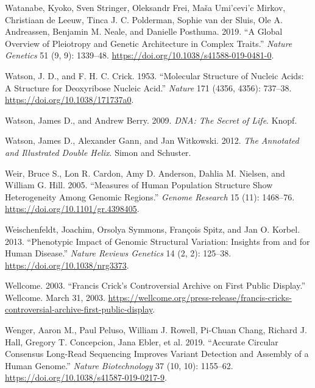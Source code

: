 \documentclass[
]{book}
\newlength{\cslhangindent}
\newlength{\cslentryspacingunit} %
\newenvironment{CSLReferences}[2] %
 {%
  \setlength{\parindent}{0pt}
  \ifodd #1
  \let\oldpar\par
  \def\par{\hangindent=\cslhangindent\oldpar}
  \fi
  \setlength{\parskip}{#2\cslentryspacingunit}
 }%
 {}
\begin{document}
\begin{CSLReferences}{1}{0}
\leavevmode{}%
Watanabe, Kyoko, Sven Stringer, Oleksandr Frei, Maša Umi'cevi'c Mirkov, Christiaan de Leeuw, Tinca J. C. Polderman, Sophie van der Sluis, Ole A. Andreassen, Benjamin M. Neale, and Danielle Posthuma. 2019. {``A Global Overview of Pleiotropy and Genetic Architecture in Complex Traits.''} \emph{Nature Genetics} 51 (9, 9): 1339--48. \url{https://doi.org/10.1038/s41588-019-0481-0}.

\leavevmode{}%
Watson, J. D., and F. H. C. Crick. 1953. {``Molecular {Structure} of {Nucleic Acids}: {A Structure} for {Deoxyribose Nucleic Acid}.''} \emph{Nature} 171 (4356, 4356): 737--38. \url{https://doi.org/10.1038/171737a0}.

\leavevmode{}%
Watson, James D., and Andrew Berry. 2009. \emph{{DNA}: {The} Secret of Life}. {Knopf}.

\leavevmode{}%
Watson, James D., Alexander Gann, and Jan Witkowski. 2012. \emph{The Annotated and Illustrated Double Helix}. {Simon and Schuster}.

\leavevmode{}%
Weir, Bruce S., Lon R. Cardon, Amy D. Anderson, Dahlia M. Nielsen, and William G. Hill. 2005. {``Measures of Human Population Structure Show Heterogeneity Among Genomic Regions.''} \emph{Genome Research} 15 (11): 1468--76. \url{https://doi.org/10.1101/gr.4398405}.

\leavevmode{}%
Weischenfeldt, Joachim, Orsolya Symmons, François Spitz, and Jan O. Korbel. 2013. {``Phenotypic Impact of Genomic Structural Variation: Insights from and for Human Disease.''} \emph{Nature Reviews Genetics} 14 (2, 2): 125--38. \url{https://doi.org/10.1038/nrg3373}.

\leavevmode{}%
Wellcome. 2003. {``Francis {Crick}'s Controversial Archive on First Public Display.''} {Wellcome}. March 31, 2003. \url{https://wellcome.org/press-release/francis-cricks-controversial-archive-first-public-display}.

\leavevmode{}%
Wenger, Aaron M., Paul Peluso, William J. Rowell, Pi-Chuan Chang, Richard J. Hall, Gregory T. Concepcion, Jana Ebler, et al. 2019. {``Accurate Circular Consensus Long-Read Sequencing Improves Variant Detection and Assembly of a Human Genome.''} \emph{Nature Biotechnology} 37 (10, 10): 1155--62. \url{https://doi.org/10.1038/s41587-019-0217-9}.


\end{CSLReferences}
\end{document}
